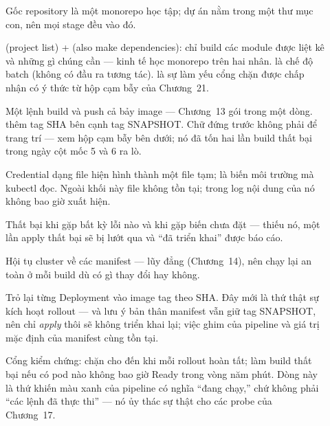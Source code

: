 \begin{description}
  \item[] Gốc repository là một monorepo học tập; dự án nằm
  trong một thư mục con, nên mọi stage đều  vào đó.
  \item[]  (project list) +  (also make
  dependencies): chỉ build các module được liệt kê và những gì chúng
  cần --- kinh tế học monorepo trên hai nhân.  là chế độ
  batch (không có đầu ra tương tác).  là sự làm yếu
  cổng chặn được chấp nhận có ý thức từ hộp cạm bẫy của Chương~21.
  \item[] Một lệnh build và push cả bảy image --- Chương~13 gói
  trong một dòng.  thêm tag SHA bên cạnh tag
  SNAPSHOT. Chữ  đứng trước  không phải
  để trang trí --- xem hộp cạm bẫy bên dưới; nó đã tốn hai lần build
  thất bại trong ngày cột mốc 5 và 6 ra lò.
  \item[] Credential dạng file hiện hình thành một file tạm;
   là biến môi trường mà kubectl đọc. Ngoài khối này
  file không tồn tại; trong log nội dung của nó không bao giờ xuất
  hiện.
  \item[] Thất bại khi gặp bất kỳ lỗi nào và khi gặp biến chưa
  đặt --- thiếu nó, một lần apply thất bại sẽ bị lướt qua và
  ``đã triển khai'' được báo cáo.
  \item[] Hội tụ cluster về các manifest --- lũy đẳng
  (Chương~14), nên chạy lại an toàn ở mỗi build dù có gì thay đổi hay
  không.
  \item[] Trỏ lại từng Deployment vào image tag theo SHA. Đây
  mới là thứ thật sự kích hoạt rollout --- và lưu ý bản thân manifest
  vẫn giữ tag SNAPSHOT, nên chỉ \emph{apply} thôi sẽ không triển khai
  lại; việc ghim của pipeline và giá trị mặc định của manifest cùng
  tồn tại.
  \item[] Cổng kiểm chứng: chặn cho đến khi mỗi rollout hoàn
  tất; làm build thất bại nếu có pod nào không bao giờ Ready trong
  vòng năm phút. Dòng này là thứ khiến màu xanh của pipeline có nghĩa
  ``đang chạy,'' chứ không phải ``các lệnh đã thực thi'' --- nó ủy
  thác sự thật cho các probe của Chương~17.
\end{description}

